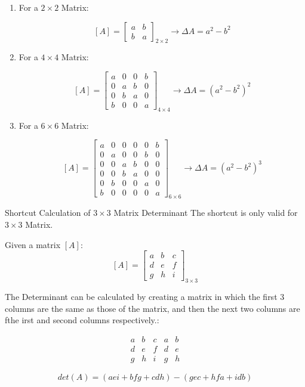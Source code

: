 \begin{enumerate}
    \item For a $2 \times 2$ Matrix:

    $$  [A] = \begin{bmatrix}
        a & b \\
        b & a
        \end{bmatrix}_{2 \times 2} \xrightarrow{} \Delta A = a^2 - b^2
    $$

    \item For a $4 \times 4$ Matrix:

    $$  [A] = \begin{bmatrix}
        a & 0 & 0 & b \\
        0 & a & b & 0 \\
        0 & b & a & 0 \\
        b & 0 & 0 & a
        \end{bmatrix}_{4 \times 4} \xrightarrow{} \Delta A = (a^2 - b^2)^2
    $$

    \item For a $6 \times 6$ Matrix:

    $$  [A] = \begin{bmatrix}
        a & 0 & 0 & 0 & 0 & b \\
        0 & a & 0 & 0 & b & 0 \\
        0 & 0 & a & b & 0 & 0 \\
        0 & 0 & b & a & 0 & 0 \\
        0 & b & 0 & 0 & a & 0 \\
        b & 0 & 0 & 0 & 0 & a
        \end{bmatrix}_{6 \times 6} \xrightarrow{} \Delta A = (a^2 - b^2)^3
    $$
\end{enumerate}

\begin{impbox}{Shortcut Calculation of $3 \times 3$ Matrix Determinant}
    The shortcut is only valid for $3 \times 3$ Matrix.

    Given a matrix $[A]$:
    $$  [A] = \begin{bmatrix}
        a & b & c \\
        d & e & f \\
        g & h & i
        \end{bmatrix}_{3 \times 3} $$

    The Determinant can be calculated by creating a matrix in which the first 3 columns are the same as those of the matrix, and then the next two columns are fthe irst and second columns respectively.:

    $$  \begin{matrix}
        a & b & c & a & b \\
        d & e & f & d & e \\
        g & h & i & g & h
        \end{matrix}
    $$

    $$ det(A) = (aei + bfg + cdh) - (gec + hfa + idb) $$
\end{impbox}

